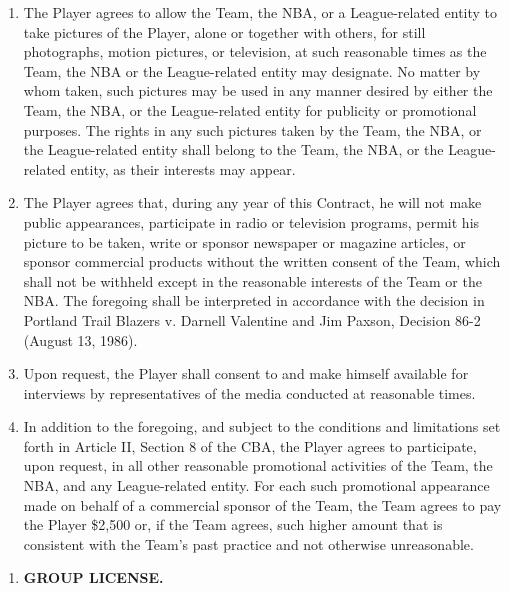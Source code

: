 \documentclass[
]{book}
\providecommand{\tightlist}{%
  \setlength{\itemsep}{0pt}\setlength{\parskip}{0pt}}
\begin{document}
\begin{enumerate}
\def\labelenumi{(\alph{enumi})}
\tightlist
\item
  The Player agrees to allow the Team, the NBA, or a League-related entity to take pictures of the Player, alone or together with others, for still photographs, motion pictures, or television, at such reasonable times as the Team, the NBA or the League-related entity may designate. No matter by whom taken, such pictures may be used in any manner desired by either the Team, the NBA, or the League-related entity for publicity or promotional purposes. The rights in any such pictures taken by the Team, the NBA, or the League-related entity shall belong to the Team, the NBA, or the League-related entity, as their interests may appear.
\item
  The Player agrees that, during any year of this Contract, he will not make public appearances, participate in radio or television programs, permit his picture to be taken, write or sponsor newspaper or magazine articles, or sponsor commercial products without the written consent of the Team, which shall not be withheld except in the reasonable interests of the Team or the NBA. The foregoing shall be interpreted in accordance with the decision in Portland Trail Blazers v. Darnell Valentine and Jim Paxson, Decision 86-2 (August 13, 1986).
\item
  Upon request, the Player shall consent to and make himself available for interviews by representatives of the media conducted at reasonable times.
\item
  In addition to the foregoing, and subject to the conditions and limitations set forth in Article II, Section 8 of the CBA, the Player agrees to participate, upon request, in all other reasonable promotional activities of the Team, the NBA, and any League-related entity. For each such promotional appearance made on behalf of a commercial sponsor of the Team, the Team agrees to pay the Player \$2,500 or, if the Team agrees, such higher amount that is consistent with the Team's past practice and not otherwise unreasonable.
\end{enumerate}

\begin{enumerate}
\def\labelenumi{\arabic{enumi}.}
\setcounter{enumi}{13}
\tightlist
\item
  \textbf{GROUP LICENSE.}
\end{enumerate}
\end{document}
